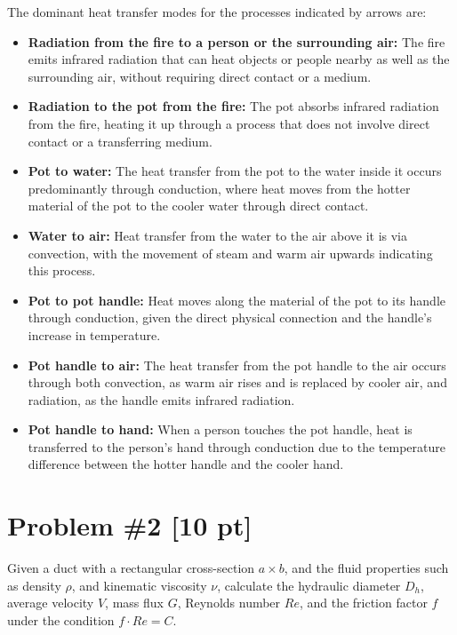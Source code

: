 \documentclass{article}
\begin{document}
The dominant heat transfer modes for the processes indicated by arrows are:
\begin{itemize}
    \item \textbf{Radiation from the fire to a person or the surrounding air:} The fire emits infrared radiation that can heat objects or people nearby as well as the surrounding air, without requiring direct contact or a medium.
    
    \item \textbf{Radiation to the pot from the fire:} The pot absorbs infrared radiation from the fire, heating it up through a process that does not involve direct contact or a transferring medium.
    
    \item \textbf{Pot to water:} The heat transfer from the pot to the water inside it occurs predominantly through conduction, where heat moves from the hotter material of the pot to the cooler water through direct contact.
    
    \item \textbf{Water to air:} Heat transfer from the water to the air above it is via convection, with the movement of steam and warm air upwards indicating this process.
    
    \item \textbf{Pot to pot handle:} Heat moves along the material of the pot to its handle through conduction, given the direct physical connection and the handle's increase in temperature.
    
    \item \textbf{Pot handle to air:} The heat transfer from the pot handle to the air occurs through both convection, as warm air rises and is replaced by cooler air, and radiation, as the handle emits infrared radiation.
    
    \item \textbf{Pot handle to hand:} When a person touches the pot handle, heat is transferred to the person's hand through conduction due to the temperature difference between the hotter handle and the cooler hand.
\end{itemize}


\newpage
\section{Problem \#2 [10 pt]}
Given a duct with a rectangular cross-section \( a \times b \), and the fluid properties such as density \( \rho \), and kinematic viscosity \( \nu \), calculate the hydraulic diameter \( D_h \), average velocity \( V \), mass flux \( G \), Reynolds number \( Re \), and the friction factor \( f \) under the condition \( f \cdot Re = C \).
\end{document}
